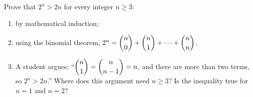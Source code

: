 Prove that $2^n>2n$ for every integer $n\ge3$:
\begin{enumerate}
\item[(a)] by mathematical induction;
\item[(b)] using the binomial theorem, $2^n=\dbinom n0+\dbinom n1+\cdots+\dbinom nn$.
\item[(c)] A student argues: ``$\dbinom n1=\dbinom n{n-1}=n$, and there are more than two terms, so $2^n>2n$.'' Where does this argument need $n\ge3$? Is the inequality true for $n=1$ and $n=2$?
\end{enumerate}

